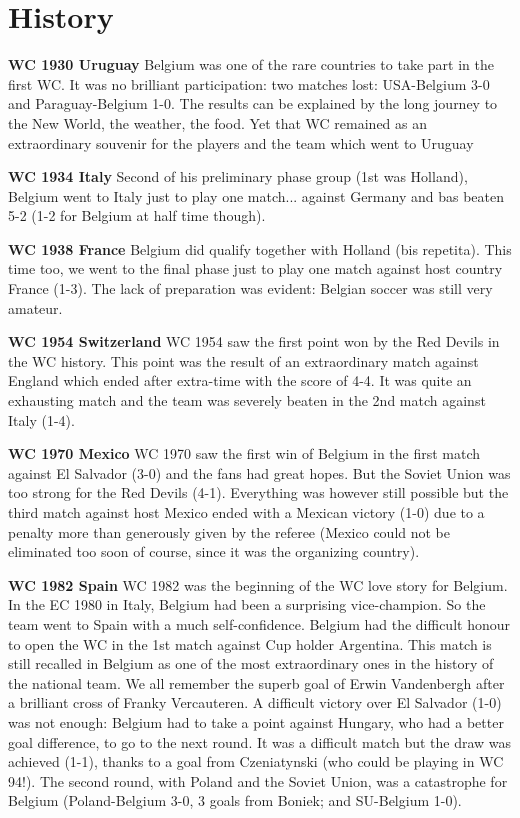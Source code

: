 \section{History}
\textbf{WC 1930 Uruguay}
Belgium was one of the rare countries to take part in the first WC. It was
no brilliant participation: two matches lost: USA-Belgium 3-0 and
Paraguay-Belgium 1-0. The results can be explained by the long journey to
the New World, the weather, the food. Yet that WC remained as an
extraordinary souvenir for the players and the team which went to Uruguay

\textbf{WC 1934 Italy}
Second of his preliminary phase group (1st was Holland), Belgium went to
Italy just to play one match... against Germany and bas beaten 5-2 (1-2 for
Belgium at half time though).

\textbf{WC 1938 France}
Belgium did qualify together with Holland (bis repetita). This time too, we
went to the final phase just to play one match against host country France
(1-3). The lack of preparation was evident: Belgian soccer was still very
amateur.

\textbf{WC 1954 Switzerland}
WC 1954 saw the first point won by the Red Devils in the WC history. This
point was the result of an extraordinary match against England which ended
after extra-time with the score of 4-4. It was quite an exhausting match and
the team was severely beaten in the 2nd match against Italy (1-4).

\textbf{WC 1970 Mexico}
WC 1970 saw the first win of Belgium in the first match against El Salvador
(3-0) and the fans had great hopes. But the Soviet Union was too strong for
the Red Devils (4-1). Everything was however still possible but the third
match against host Mexico ended with a Mexican victory (1-0) due to a
penalty more than generously given by the referee (Mexico could not be
eliminated too soon of course, since it was the organizing country).

\textbf{WC 1982 Spain}
WC 1982 was the beginning of the WC love story for Belgium. In the EC 1980
in Italy, Belgium had been a surprising vice-champion. So the team went to
Spain with a much self-confidence. Belgium had the difficult honour to open
the WC in the 1st match against Cup holder Argentina. This match is still
recalled in Belgium as one of the most extraordinary ones in the history of
the national team. We all remember the superb goal of Erwin Vandenbergh
after a brilliant cross of Franky Vercauteren. A difficult victory over El
Salvador (1-0) was not enough: Belgium had to take a point against Hungary,
who had a better goal difference, to go to the next round. It was a
difficult match but the draw was achieved (1-1), thanks to a goal from
Czeniatynski (who could be playing in WC 94!). The second round, with Poland
and the Soviet Union, was a catastrophe for Belgium (Poland-Belgium 3-0, 3
goals from Boniek; and SU-Belgium 1-0).


